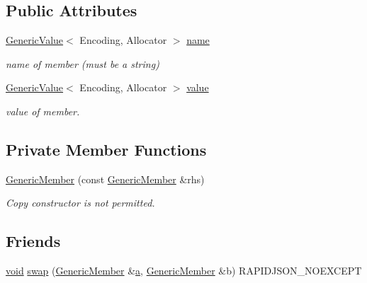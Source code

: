 \subsection*{Public Attributes}
\begin{DoxyCompactItemize}
\item 
\hyperlink{classGenericValue}{Generic\+Value}$<$ Encoding, Allocator $>$ \hyperlink{classGenericMember_a7124f7ccd67421533d33139938604fac}{name}
\begin{DoxyCompactList}\small\item\em name of member (must be a string) \end{DoxyCompactList}\item 
\hyperlink{classGenericValue}{Generic\+Value}$<$ Encoding, Allocator $>$ \hyperlink{classGenericMember_aad3cfa4f9e8b9018068c8bc865723083}{value}
\begin{DoxyCompactList}\small\item\em value of member. \end{DoxyCompactList}\end{DoxyCompactItemize}
\subsection*{Private Member Functions}
\begin{DoxyCompactItemize}
\item 
\hyperlink{classGenericMember_ab9c79af91543b05cc88af0f930e7556e}{Generic\+Member} (const \hyperlink{classGenericMember}{Generic\+Member} \&rhs)
\begin{DoxyCompactList}\small\item\em Copy constructor is not permitted. \end{DoxyCompactList}\end{DoxyCompactItemize}
\subsection*{Friends}
\begin{DoxyCompactItemize}
\item 
\hyperlink{imgui__impl__opengl3__loader_8h_ac668e7cffd9e2e9cfee428b9b2f34fa7}{void} \hyperlink{classGenericMember_af72094da5f8967de3fab3d2c34bc71cc}{swap} (\hyperlink{classGenericMember}{Generic\+Member} \&\hyperlink{pointer_8h_aeeddce917cf130d62c370b8f216026dd}{a}, \hyperlink{classGenericMember}{Generic\+Member} \&b) R\+A\+P\+I\+D\+J\+S\+O\+N\+\_\+\+N\+O\+E\+X\+C\+E\+PT
\end{DoxyCompactItemize}


